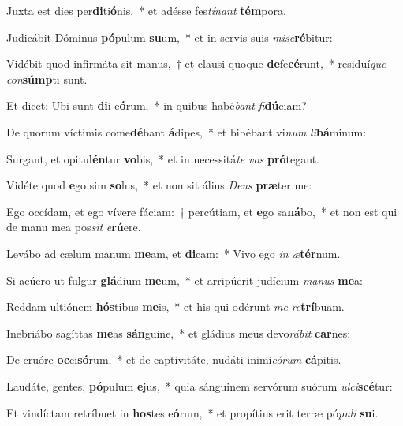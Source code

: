 \item Juxta est dies per\textbf{di}ti\textbf{ó}nis,~* et adésse fes\textit{tí}\textit{nant} \textbf{tém}pora.
\item Judicábit Dóminus \textbf{pó}pulum \textbf{su}um,~* et in servis suis \textit{mi}\textit{se}\textbf{ré}bitur:
\item Vidébit quod infirmáta sit manus,~† et clausi quoque \textbf{de}fe\textbf{cé}runt,~* residuí\textit{que} \textit{con}\textbf{súmp}ti sunt.
\item Et dicet: Ubi sunt \textbf{di}i e\textbf{ó}rum,~* in quibus habé\textit{bant} \textit{fi}\textbf{dú}ciam?
\item De quorum víctimis come\textbf{dé}bant \textbf{á}dipes,~* et bibébant vi\textit{num} \textit{li}\textbf{bá}minum:
\item Surgant, et opitu\textbf{lén}tur \textbf{vo}bis,~* et in necessitá\textit{te} \textit{vos} \textbf{pró}tegant.
\item Vidéte quod \textbf{e}go sim \textbf{so}lus,~* et non sit álius \textit{De}\textit{us} \textbf{præ}ter me:
\item Ego occídam, et ego vívere fáciam:~† percútiam, et \textbf{e}go sa\textbf{ná}bo,~* et non est qui de manu mea pos\textit{sit} \textit{e}\textbf{rú}ere.
\item Levábo ad cælum manum \textbf{me}am, et \textbf{di}cam:~* Vivo ego \textit{in} \textit{æ}\textbf{tér}num.
\item Si acúero ut fulgur \textbf{glá}dium \textbf{me}um,~* et arripúerit judícium \textit{ma}\textit{nus} \textbf{me}a:
\item Reddam ultiónem \textbf{hós}tibus \textbf{me}is,~* et his qui odérunt \textit{me} \textit{re}\textbf{trí}buam.
\item Inebriábo sagíttas \textbf{me}as \textbf{sán}guine,~* et gládius meus devo\textit{rá}\textit{bit} \textbf{car}nes:
\item De cruóre \textbf{oc}ci\textbf{só}rum,~* et de captivitáte, nudáti inimi\textit{có}\textit{rum} \textbf{cá}pitis.
\item Laudáte, gentes, \textbf{pó}pulum \textbf{e}jus,~* quia sánguinem servórum suórum \textit{ul}\textit{ci}\textbf{scé}tur:
\item Et vindíctam retríbuet in \textbf{hos}tes e\textbf{ó}rum,~* et propítius erit terræ pó\textit{pu}\textit{li} \textbf{su}i.
